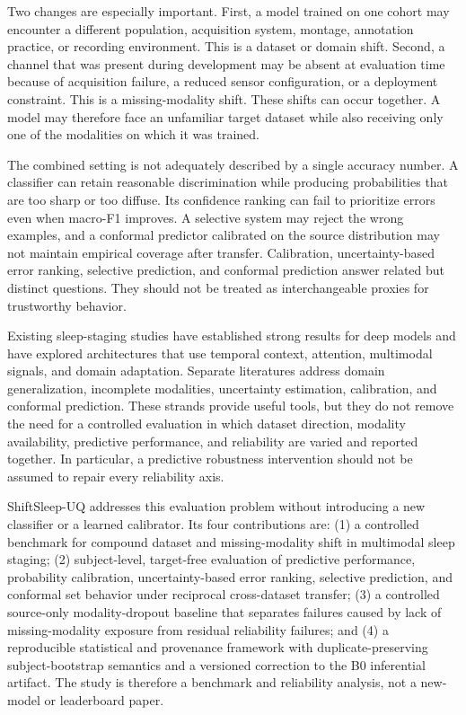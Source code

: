 \documentclass[10pt,twocolumn]{article}
\begin{document}
Two changes are especially important. First, a model trained on one cohort may encounter a different population, acquisition system, montage, annotation practice, or recording environment. This is a dataset or domain shift. Second, a channel that was present during development may be absent at evaluation time because of acquisition failure, a reduced sensor configuration, or a deployment constraint. This is a missing-modality shift. These shifts can occur together. A model may therefore face an unfamiliar target dataset while also receiving only one of the modalities on which it was trained.

The combined setting is not adequately described by a single accuracy number. A classifier can retain reasonable discrimination while producing probabilities that are too sharp or too diffuse. Its confidence ranking can fail to prioritize errors even when macro-F1 improves. A selective system may reject the wrong examples, and a conformal predictor calibrated on the source distribution may not maintain empirical coverage after transfer. Calibration, uncertainty-based error ranking, selective prediction, and conformal prediction answer related but distinct questions. They should not be treated as interchangeable proxies for trustworthy behavior.

Existing sleep-staging studies have established strong results for deep models and have explored architectures that use temporal context, attention, multimodal signals, and domain adaptation. Separate literatures address domain generalization, incomplete modalities, uncertainty estimation, calibration, and conformal prediction. These strands provide useful tools, but they do not remove the need for a controlled evaluation in which dataset direction, modality availability, predictive performance, and reliability are varied and reported together. In particular, a predictive robustness intervention should not be assumed to repair every reliability axis.

ShiftSleep-UQ addresses this evaluation problem without introducing a new classifier or a learned calibrator. Its four contributions are: (1) a controlled benchmark for compound dataset and missing-modality shift in multimodal sleep staging; (2) subject-level, target-free evaluation of predictive performance, probability calibration, uncertainty-based error ranking, selective prediction, and conformal set behavior under reciprocal cross-dataset transfer; (3) a controlled source-only modality-dropout baseline that separates failures caused by lack of missing-modality exposure from residual reliability failures; and (4) a reproducible statistical and provenance framework with duplicate-preserving subject-bootstrap semantics and a versioned correction to the B0 inferential artifact. The study is therefore a benchmark and reliability analysis, not a new-model or leaderboard paper.
\end{document}
